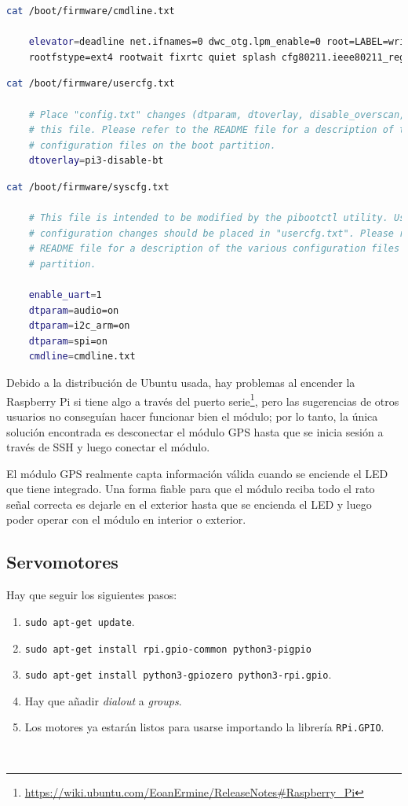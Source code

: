 \begin{lstlisting}[language=bash]
	cat /boot/firmware/cmdline.txt 
	
	elevator=deadline net.ifnames=0 dwc_otg.lpm_enable=0 root=LABEL=writable \
	rootfstype=ext4 rootwait fixrtc quiet splash cfg80211.ieee80211_regdom=GB
\end{lstlisting}

\begin{lstlisting}[language=bash]
	cat /boot/firmware/usercfg.txt 
	
	# Place "config.txt" changes (dtparam, dtoverlay, disable_overscan, etc.) in
	# this file. Please refer to the README file for a description of the various
	# configuration files on the boot partition.
	dtoverlay=pi3-disable-bt
\end{lstlisting}

\begin{lstlisting}[language=bash]
	cat /boot/firmware/syscfg.txt 
	
	# This file is intended to be modified by the pibootctl utility. User
	# configuration changes should be placed in "usercfg.txt". Please refer to the
	# README file for a description of the various configuration files on the boot
	# partition.
	
	enable_uart=1
	dtparam=audio=on
	dtparam=i2c_arm=on
	dtparam=spi=on
	cmdline=cmdline.txt	
\end{lstlisting}


Debido a la distribución de Ubuntu usada, hay problemas al encender la Raspberry Pi si tiene algo a través del puerto serie\footnote{\url{https://wiki.ubuntu.com/EoanErmine/ReleaseNotes\#Raspberry_Pi}}, pero las sugerencias de otros usuarios no conseguían hacer funcionar bien el módulo; por lo tanto, la única solución encontrada es desconectar el módulo \acs{GPS} hasta que se inicia sesión a través de SSH y luego conectar el módulo.

El módulo GPS realmente capta información válida cuando se enciende el LED que tiene integrado. Una forma fiable para que el módulo reciba todo el rato señal correcta es dejarle en el exterior hasta que se encienda el LED y luego poder operar con el módulo en interior o exterior. 

\subsection{Servomotores}
\label{subsec:anexomotores}

Hay que seguir los siguientes pasos:

\begin{enumerate}
	\item \verb|sudo apt-get update|.
	\item \verb|sudo apt-get install rpi.gpio-common python3-pigpio|
	\item \verb|sudo apt-get install python3-gpiozero python3-rpi.gpio|.
	\item Hay que añadir \textit{dialout} a \textit{groups}.
	\item Los motores ya estarán listos para usarse importando la librería \verb|RPi.GPIO|.
\end{enumerate}\


